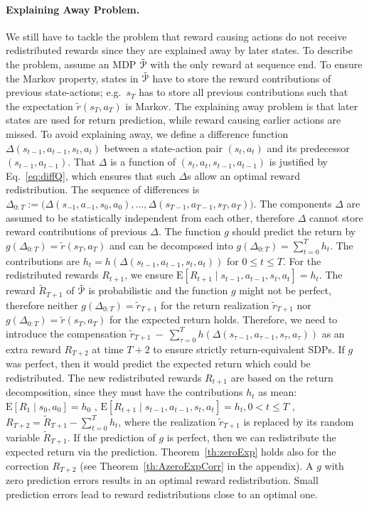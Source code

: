 \documentclass{article}
\newcommand\EXP{\mathbf{\mathrm{E}}}
\renewcommand{\leq}{\leqslant}
\begin{document}
\paragraph{Explaining Away Problem.}
\label{para:explainingAway}
We still have to tackle the problem that reward causing actions do not receive redistributed rewards
since they are explained away by later states.
To describe the problem, assume an MDP $\tilde{\mathcal{P}}$ with the only 
reward at sequence end.
To ensure the Markov property, states in $\tilde{\mathcal{P}}$ have to store 
the reward contributions of previous state-actions;
e.g.\ $s_T$ has to store all previous contributions such that the expectation $\tilde{r}(s_T,a_T)$
is Markov.
The explaining away problem is that later states
are used for return prediction, while reward causing
earlier actions are missed.
To avoid explaining away,
we define a difference function $\Delta(s_{t-1},a_{t-1},s_t,a_t)$
between a state-action pair $(s_t,a_t)$ and 
its predecessor $(s_{t-1},a_{t-1})$.
That $\Delta$ is a function of $(s_t,a_t,s_{t-1},a_{t-1})$
is justified by Eq.~\eqref{eq:diffQ}, which ensures that such
$\Delta$s allow an optimal reward redistribution.
The sequence of differences is 
$\Delta_{0:T} := \big(\Delta(s_{-1},a_{-1},s_0,a_0),\ldots,
 \Delta(s_{T-1},a_{T-1},s_T,a_T)\big)$. 
The components $\Delta$ are assumed 
to be statistically independent from each other, therefore
$\Delta$ cannot store reward contributions of previous $\Delta$.
The function $g$ should predict the return by 
$g(\Delta_{0:T}) = \tilde{r}(s_T,a_T)$ and
can be decomposed into $g(\Delta_{0:T}) = \sum_{t=0}^T h_t$. 
The contributions are
$h_t = h(\Delta(s_{t-1},a_{t-1},s_t,a_t))$
for $0 \leq t \leq T$.
For the redistributed rewards $R_{t+1}$, we ensure 
$\EXP \left[ R_{t+1} \mid s_{t-1},a_{t-1},s_t,a_t \right]  =  h_t$.
The reward $\tilde{R}_{T+1}$ of $\tilde{\mathcal{P}}$
is probabilistic and 
the function $g$ might not be perfect,
therefore neither $g(\Delta_{0:T}) = \tilde{r}_{T+1}$ for the return
realization $\tilde{r}_{T+1}$ nor
$g(\Delta_{0:T}) = \tilde{r}(s_T,a_T)$ for the expected return
holds.
Therefore, we need to introduce the compensation
$\tilde{r}_{T+1} \ - \ 
  \sum_{\tau=0}^T h(\Delta(s_{\tau-1},a_{\tau-1},s_{\tau},a_{\tau}))$
as an extra reward $R_{T+2}$ at time $T+2$
to ensure strictly return-equivalent SDPs.
If $g$ was perfect, then it would predict the expected return which
could be redistributed.
The new redistributed rewards
$R_{t+1}$ are based on the return decomposition, since they 
must have the contributions $h_t$ as mean:\newline
$\EXP \left[ R_1 \mid s_0,a_0 \right]   =  h_0$ , 
$\EXP \left[ R_{t+1} \mid s_{t-1},a_{t-1},s_t,a_t \right] 
   =  h_t, 0 < t \leq T$  , 
$R_{T+2}  = \tilde{R}_{T+1}  -  \sum_{t=0}^T h_t$,
where the realization $\tilde{r}_{T+1}$ is replaced by its
random variable $\tilde{R}_{T+1}$.
If the prediction of $g$ is perfect, then we can
redistribute the expected return via the prediction.
Theorem~\ref{th:zeroExp} holds also for
the correction $R_{T+2}$ (see Theorem~\ref{th:AzeroExpCorr} in the appendix). 
A $g$ with zero prediction errors 
results in an optimal reward redistribution.
Small prediction errors lead to reward redistributions 
close to an optimal one.
\end{document}
